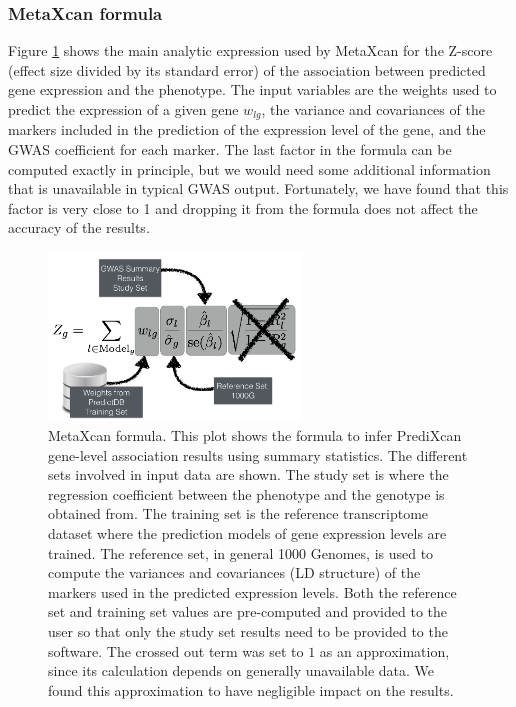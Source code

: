 \documentclass[10pt]{article}
\begin{document}
\subsubsection*{MetaXcan formula}

Figure \ref{fig:metaxcan-formula} shows the main analytic expression used by MetaXcan for the Z-score (effect size divided by its standard error) of the association between predicted gene expression and the phenotype. The input variables are the weights used to predict the expression of a given gene $w_{lg}$, the variance and covariances of the markers included in the prediction of the expression level of the gene, and the GWAS coefficient for each marker. The last factor in the formula can be computed exactly in principle, but we would need some additional information that is unavailable in typical GWAS output. Fortunately, we have found that this factor is very close to 1 and dropping it from the formula does not affect the accuracy of the results.


\begin{figure}
\begin{center}
\includegraphics[width=0.6\textwidth]{plots/Fig2-MetaXcan-Formula.png}
\caption{MetaXcan formula. This plot shows the formula to infer PrediXcan gene-level association results using summary statistics. The different sets involved in input data are shown. The study set is where the regression coefficient between the phenotype and the genotype is obtained from. The training set is the reference transcriptome dataset where the prediction models of gene expression levels are trained. The reference set, in general 1000 Genomes, is used to compute the variances and covariances (LD structure) of the markers used in the predicted expression levels. Both the reference set and training set values are pre-computed and provided to the user so that only the study set results need to be provided to the software. The crossed out term was set to $1$ as an approximation, since its calculation depends on generally unavailable data. We found this approximation to have negligible impact on the results.} %
\label{fig:metaxcan-formula}
\end{center}
\end{figure}
\end{document}
